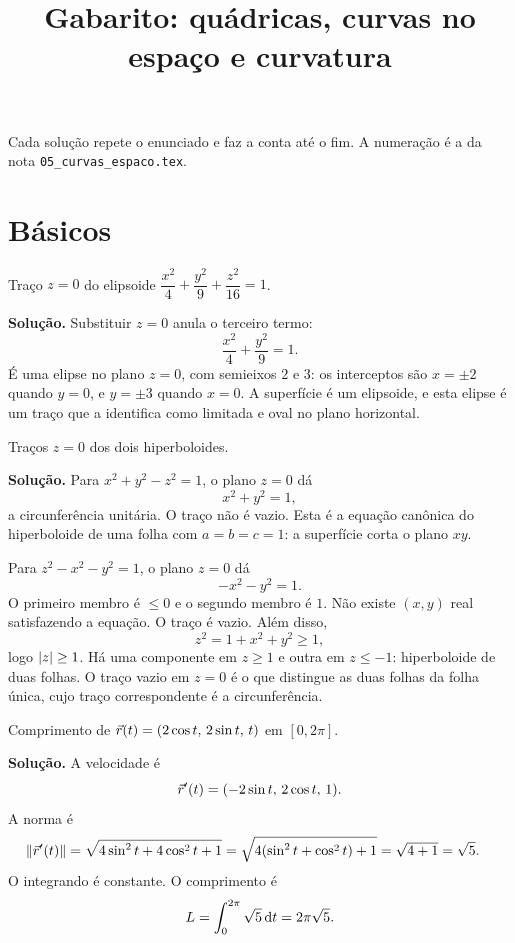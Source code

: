 \documentclass[11pt,a4paper]{article}
\title{Gabarito: quádricas, curvas no espaço e curvatura}
\author{}
\date{}
\begin{document}
\maketitle
\tableofcontents

Cada solução repete o enunciado e faz a conta até o fim. A numeração é a da nota \texttt{05\_curvas\_espaco.tex}.

\section{Básicos}

\begin{exercicio}[Básico --- B1]
Traço \(z=0\) do elipsoide \(\dfrac{x^{2}}{4}+\dfrac{y^{2}}{9}+\dfrac{z^{2}}{16}=1\).
\end{exercicio}

\noindent\textbf{Solução.}
Substituir \(z=0\) anula o terceiro termo:
\[
\frac{x^{2}}{4}+\frac{y^{2}}{9}=1.
\]
É uma elipse no plano \(z=0\), com semieixos \(2\) e \(3\): os interceptos são \(x=\pm 2\) quando \(y=0\), e \(y=\pm 3\) quando \(x=0\). A superfície é um elipsoide, e esta elipse é um traço que a identifica como limitada e oval no plano horizontal.

\begin{exercicio}[Básico --- B2]
Traços \(z=0\) dos dois hiperboloides.
\end{exercicio}

\noindent\textbf{Solução.}
Para \(x^{2}+y^{2}-z^{2}=1\), o plano \(z=0\) dá
\[
x^{2}+y^{2}=1,
\]
a circunferência unitária. O traço não é vazio. Esta é a equação canônica do hiperboloide de uma folha com \(a=b=c=1\): a superfície corta o plano \(xy\).

Para \(z^{2}-x^{2}-y^{2}=1\), o plano \(z=0\) dá
\[
-x^{2}-y^{2}=1.
\]
O primeiro membro é \(\le 0\) e o segundo membro é \(1\). Não existe \((x,y)\) real satisfazendo a equação. O traço é vazio. Além disso,
\[
z^{2}=1+x^{2}+y^{2}\ge 1,
\]
logo \(\left\lvert z \right\rvert\ge 1\). Há uma componente em \(z\ge 1\) e outra em \(z\le -1\): hiperboloide de duas folhas. O traço vazio em \(z=0\) é o que distingue as duas folhas da folha única, cujo traço correspondente é a circunferência.

\begin{exercicio}[Básico --- B3]
Comprimento de \(\vec{r}(t)=(2\cos t,\,2\sin t,\,t)\) em \([0,2\pi]\).
\end{exercicio}

\noindent\textbf{Solução.}
A velocidade é
\[
\vec{r}'(t)=(-2\sin t,\,2\cos t,\,1).
\]
A norma é
\begin{align*}
\left\lVert \vec{r}'(t) \right\rVert
&=\sqrt{4\sin^{2}t+4\cos^{2}t+1}
=\sqrt{4(\sin^{2}t+\cos^{2}t)+1}
=\sqrt{4+1}
=\sqrt{5}.
\end{align*}
O integrando é constante. O comprimento é
\[
L=\int_{0}^{2\pi}\sqrt{5}\,\mathrm{d} t=2\pi\sqrt{5}.
\]
\end{document}
